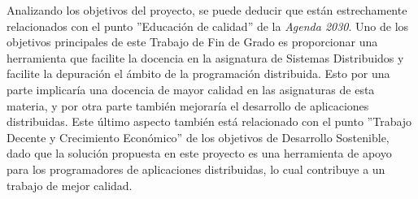 Analizando los objetivos del proyecto, se puede deducir que están estrechamente relacionados con el punto ''Educación de calidad'' de la \textit{Agenda 2030}. Uno de los objetivos principales de este Trabajo de Fin de Grado es proporcionar una herramienta que facilite la docencia en la asignatura de Sistemas Distribuidos y facilite la depuración el ámbito de la programación distribuida. Esto por una parte implicaría una docencia de mayor calidad en las asignaturas de esta materia, y por otra parte también mejoraría el desarrollo de aplicaciones distribuidas. Este último aspecto también está relacionado con el punto ''Trabajo Decente y Crecimiento Económico'' de los objetivos de Desarrollo Sostenible, dado que la solución propuesta en este proyecto es una herramienta de apoyo para los programadores de aplicaciones distribuidas, lo cual contribuye a un trabajo de mejor calidad.
